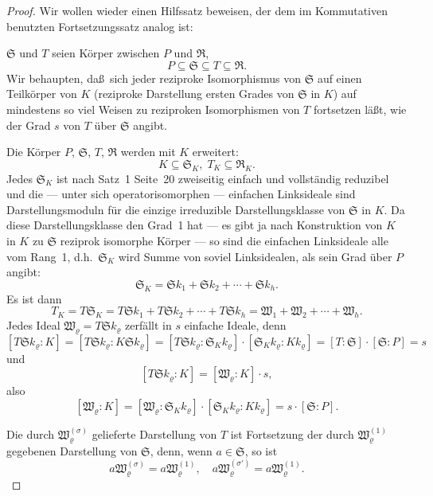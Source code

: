 \documentclass[12pt,a4paper]{article}
\theoremstyle{plain}
\theoremstyle{definition}
\theoremstyle{remark}
\begin{document}
\begin{proof}
Wir wollen wieder einen Hilfssatz beweisen, der dem im Kommutativen benutzten
Fortsetzungssatz analog ist:

$\mathfrak{S}$ und $T$ seien K\"orper zwischen $P$ und $\mathfrak{R}$,
\[
P \subseteq \mathfrak{S} \subseteq T \subseteq \mathfrak{R}.
\]
Wir behaupten, da\ss\ sich jeder reziproke Isomorphismus von $\mathfrak{S}$ auf einen
Teilk\"orper von $K$ (reziproke Darstellung ersten Grades von $\mathfrak{S}$ in $K$) auf
mindestens so viel Weisen zu reziproken Isomorphismen von $T$ fortsetzen l\"a\ss t,
wie der Grad $s$ von $T$ \"uber $\mathfrak{S}$ angibt.

Die K\"orper $P$, $\mathfrak{S}$, $T$, $\mathfrak{R}$ werden mit $K$ erweitert:
\[
K \subseteq \mathfrak{S}_{K}, \; T_{K} \subseteq \mathfrak{R}_{K}.
\]
Jedes $\mathfrak{S}_{K}$ ist nach Satz~1 Seite~20 zweiseitig einfach und vollst\"andig
reduzibel und die --- unter sich operatorisomorphen --- einfachen Linksideale
sind Darstellungsmoduln f\"ur die einzige irreduzible Darstellungsklasse von
$\mathfrak{S}$ in $K$. Da diese Darstellungsklasse den Grad~1 hat --- es gibt ja nach
Konstruktion von $K$ in $K$ zu $\mathfrak{S}$ reziprok isomorphe K\"orper --- so sind die
einfachen Linksideale alle vom Rang~1, d.h.\ $\mathfrak{S}_{K}$ wird Summe von soviel
Linksidealen, als sein Grad \"uber $P$ angibt:
\[
\mathfrak{S}_{K} = \mathfrak{S}k_{1} + \mathfrak{S}k_{2} + \cdots + \mathfrak{S}k_{h}.
\]
Es ist dann
\[
T_{K} = T\mathfrak{S}_{K} = T\mathfrak{S}k_{1} + T\mathfrak{S}k_{2} + \cdots + T\mathfrak{S}k_{h}
= \mathfrak{W}_{1} + \mathfrak{W}_{2} + \cdots + \mathfrak{W}_{h}.
\]
Jedes Ideal $\mathfrak{W}_{\varrho} = T\mathfrak{S}k_{\varrho}$ zerf\"allt in $s$ einfache Ideale, denn
\[
[T\mathfrak{S}k_{\varrho} : K] = [T\mathfrak{S}k_{\varrho} : K\mathfrak{S}k_{\varrho}]
= [T\mathfrak{S}k_{\varrho} : \mathfrak{S}_{K}k_{\varrho}] \cdot [\mathfrak{S}_{K}k_{\varrho} : Kk_{\varrho}]
= [T : \mathfrak{S}] \cdot [\mathfrak{S} : P] = s
\]
und
\[
[T\mathfrak{S}k_{\varrho} : K] = [\mathfrak{W}_{\varrho} : K] \cdot s,
\]
also
\[
[\mathfrak{W}_{\varrho} : K] = [\mathfrak{W}_{\varrho} : \mathfrak{S}_{K}k_{\varrho}] \cdot [\mathfrak{S}_{K}k_{\varrho} : Kk_{\varrho}]
= s \cdot [\mathfrak{S} : P].
\]

Die durch $\mathfrak{W}_{\varrho}^{(\sigma)}$ gelieferte Darstellung von $T$ ist Fortsetzung der durch
$\mathfrak{W}_{\varrho}^{(1)}$ gegebenen Darstellung von $\mathfrak{S}$, denn, wenn $a \in \mathfrak{S}$, so ist
\[
a\mathfrak{W}_{\varrho}^{(\sigma)} = a\mathfrak{W}_{\varrho}^{(1)}, \quad a\mathfrak{W}_{\varrho}^{(\sigma')} = a\mathfrak{W}_{\varrho}^{(1)}.
\]


\end{proof}
\end{document}
